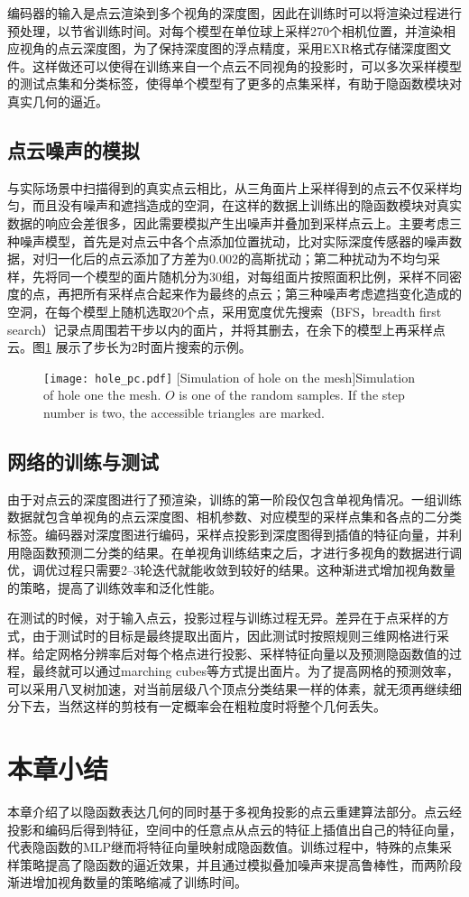 编码器的输入是点云渲染到多个视角的深度图，因此在训练时可以将渲染过程进行预处理，以节省训练时间。对每个模型在单位球上采样270个相机位置，并渲染相应视角的点云深度图，为了保持深度图的浮点精度，采用EXR格式存储深度图文件。这样做还可以使得在训练来自一个点云不同视角的投影时，可以多次采样模型的测试点集和分类标签，使得单个模型有了更多的点集采样，有助于隐函数模块对真实几何的逼近。

\subsection{点云噪声的模拟}
与实际场景中扫描得到的真实点云相比，从三角面片上采样得到的点云不仅采样均匀，而且没有噪声和遮挡造成的空洞，在这样的数据上训练出的隐函数模块对真实数据的响应会差很多，因此需要模拟产生出噪声并叠加到采样点云上。主要考虑三种噪声模型，首先是对点云中各个点添加位置扰动，比对实际深度传感器的噪声数据，对归一化后的点云添加了方差为0.002的高斯扰动；第二种扰动为不均匀采样，先将同一个模型的面片随机分为30组，对每组面片按照面积比例，采样不同密度的点，再把所有采样点合起来作为最终的点云；第三种噪声考虑遮挡变化造成的空洞，在每个模型上随机选取20个点，采用宽度优先搜索（BFS，breadth first search）记录点周围若干步以内的面片，并将其删去，在余下的模型上再采样点云。图\ref{fig:pc_hole} 展示了步长为2时面片搜索的示例。
\begin{figure}[!htbp]
    \centering
    \texttt{[image: hole\_pc.pdf]}
    [Simulation of hole on the mesh]{Simulation of hole one the mesh. $O$ is one of the random samples. If the step number is two, the accessible triangles are marked.}
    \label{fig:pc_hole}
\end{figure}

\subsection{网络的训练与测试}
由于对点云的深度图进行了预渲染，训练的第一阶段仅包含单视角情况。一组训练数据就包含单视角的点云深度图、相机参数、对应模型的采样点集和各点的二分类标签。编码器对深度图进行编码，采样点投影到深度图得到插值的特征向量，并利用隐函数预测二分类的结果。在单视角训练结束之后，才进行多视角的数据进行调优，调优过程只需要2--3轮迭代就能收敛到较好的结果。这种渐进式增加视角数量的策略，提高了训练效率和泛化性能。

在测试的时候，对于输入点云，投影过程与训练过程无异。差异在于点采样的方式，由于测试时的目标是最终提取出面片，因此测试时按照规则三维网格进行采样。给定网格分辨率后对每个格点进行投影、采样特征向量以及预测隐函数值的过程，最终就可以通过marching cubes等方式提出面片。为了提高网格的预测效率，可以采用八叉树加速，对当前层级八个顶点分类结果一样的体素，就无须再继续细分下去，当然这样的剪枝有一定概率会在粗粒度时将整个几何丢失。

\section{本章小结}
本章介绍了以隐函数表达几何的同时基于多视角投影的点云重建算法部分。点云经投影和编码后得到特征，空间中的任意点从点云的特征上插值出自己的特征向量，代表隐函数的MLP继而将特征向量映射成隐函数值。训练过程中，特殊的点集采样策略提高了隐函数的逼近效果，并且通过模拟叠加噪声来提高鲁棒性，而两阶段渐进增加视角数量的策略缩减了训练时间。